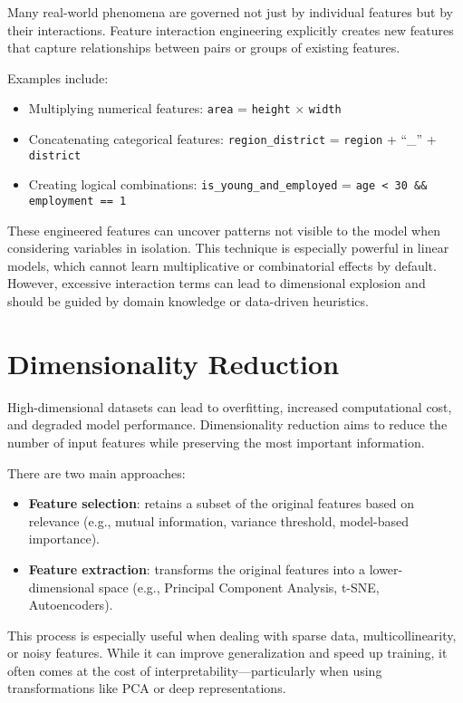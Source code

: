 \documentclass[12pt,openany, draft]{book}
\begin{document}
Many real-world phenomena are governed not just by individual features but by their interactions. Feature interaction engineering explicitly creates new features that capture relationships between pairs or groups of existing features.

Examples include:
\begin{itemize}
    \item Multiplying numerical features: \texttt{area} = \texttt{height} $\times$ \texttt{width}
    \item Concatenating categorical features: \texttt{region\_district} = \texttt{region} + ``\_'' + \texttt{district}
    \item Creating logical combinations: \texttt{is\_young\_and\_employed} = \texttt{age < 30 \&\& employment == 1}
\end{itemize}

These engineered features can uncover patterns not visible to the model when considering variables in isolation. This technique is especially powerful in linear models, which cannot learn multiplicative or combinatorial effects by default. However, excessive interaction terms can lead to dimensional explosion and should be guided by domain knowledge or data-driven heuristics.


\section{Dimensionality Reduction}

High-dimensional datasets can lead to overfitting, increased computational cost, and degraded model performance. Dimensionality reduction aims to reduce the number of input features while preserving the most important information.

There are two main approaches:
\begin{itemize}
    \item \textbf{Feature selection}: retains a subset of the original features based on relevance (e.g., mutual information, variance threshold, model-based importance).
    \item \textbf{Feature extraction}: transforms the original features into a lower-dimensional space (e.g., Principal Component Analysis, t-SNE, Autoencoders).
\end{itemize}

This process is especially useful when dealing with sparse data, multicollinearity, or noisy features. While it can improve generalization and speed up training, it often comes at the cost of interpretability—particularly when using transformations like PCA or deep representations.
\end{document}
